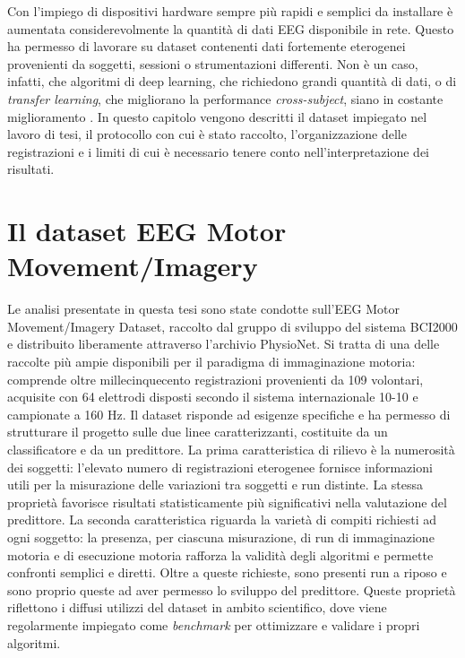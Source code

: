 Con l’impiego di dispositivi hardware sempre più rapidi e semplici da installare è aumentata considerevolmente la quantità di dati EEG disponibile in rete. Questo ha permesso di lavorare su dataset contenenti dati fortemente eterogenei provenienti da soggetti, sessioni o strumentazioni differenti. Non è un caso, infatti, che algoritmi di deep learning, che richiedono grandi quantità di dati, o di \emph{transfer learning}, che migliorano la performance \emph{cross-subject}, siano in costante miglioramento \cite{hossain2022status}. In questo capitolo vengono descritti il dataset impiegato nel lavoro di tesi, il protocollo con cui è stato raccolto, l’organizzazione delle registrazioni e i limiti di cui è necessario tenere conto nell’interpretazione dei risultati.

\section{Il dataset EEG Motor Movement/Imagery}
Le analisi presentate in questa tesi sono state condotte sull’EEG Motor Movement/Imagery Dataset, raccolto dal gruppo di sviluppo del sistema BCI2000 e distribuito liberamente attraverso l’archivio PhysioNet. Si tratta di una delle raccolte più ampie disponibili per il paradigma di immaginazione motoria: comprende oltre millecinquecento registrazioni provenienti da 109 volontari, acquisite con 64 elettrodi disposti secondo il sistema internazionale 10-10 e campionate a 160 Hz.
Il dataset risponde ad esigenze specifiche e ha permesso di strutturare il progetto sulle due linee caratterizzanti, costituite da un classificatore e da un predittore. La prima caratteristica di rilievo è la numerosità dei soggetti: l'elevato numero di registrazioni eterogenee fornisce informazioni utili per la misurazione delle variazioni tra soggetti e run distinte. La stessa proprietà favorisce risultati statisticamente più significativi nella valutazione del predittore. La seconda caratteristica riguarda la varietà di compiti richiesti ad ogni soggetto: la presenza, per ciascuna misurazione, di run di immaginazione motoria e di esecuzione motoria rafforza la validità degli algoritmi e permette confronti semplici e diretti. Oltre a queste richieste, sono presenti run a riposo e sono proprio queste ad aver permesso lo sviluppo del predittore.
Queste proprietà riflettono i diffusi utilizzi del dataset in ambito scientifico, dove viene regolarmente impiegato come \emph{benchmark} per ottimizzare e validare i propri algoritmi.

